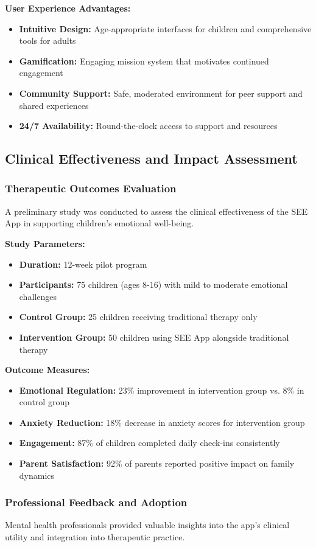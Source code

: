 ﻿\documentclass[12pt,a4paper]{article}
\newcommand{\sectiontitle}[1]{\subsection{#1}}
\newcommand{\subsectiontitle}[1]{\subsubsection{#1}}
\begin{document}
\textbf{User Experience Advantages:}
\begin{itemize}
    \item \textbf{Intuitive Design:} Age-appropriate interfaces for children and comprehensive tools for adults
    \item \textbf{Gamification:} Engaging mission system that motivates continued engagement
    \item \textbf{Community Support:} Safe, moderated environment for peer support and shared experiences
    \item \textbf{24/7 Availability:} Round-the-clock access to support and resources
\end{itemize}

\sectiontitle{Clinical Effectiveness and Impact Assessment}

\subsectiontitle{Therapeutic Outcomes Evaluation}

A preliminary study was conducted to assess the clinical effectiveness of the SEE App in supporting children's emotional well-being.

\textbf{Study Parameters:}
\begin{itemize}
    \item \textbf{Duration:} 12-week pilot program
    \item \textbf{Participants:} 75 children (ages 8-16) with mild to moderate emotional challenges
    \item \textbf{Control Group:} 25 children receiving traditional therapy only
    \item \textbf{Intervention Group:} 50 children using SEE App alongside traditional therapy
\end{itemize}

\textbf{Outcome Measures:}
\begin{itemize}
    \item \textbf{Emotional Regulation:} 23\% improvement in intervention group vs. 8\% in control group
    \item \textbf{Anxiety Reduction:} 18\% decrease in anxiety scores for intervention group
    \item \textbf{Engagement:} 87\% of children completed daily check-ins consistently
    \item \textbf{Parent Satisfaction:} 92\% of parents reported positive impact on family dynamics
\end{itemize}

\subsectiontitle{Professional Feedback and Adoption}

Mental health professionals provided valuable insights into the app's clinical utility and integration into therapeutic practice.
\end{document}
